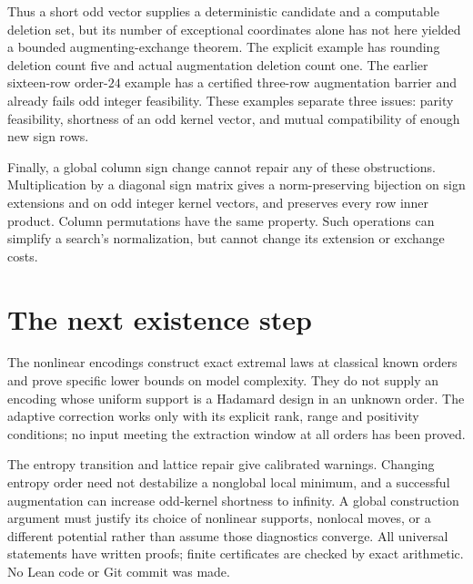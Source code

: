 \documentclass[11pt]{article}
\begin{document}
Thus a short odd vector supplies a deterministic candidate and a
computable deletion set, but its number of exceptional coordinates
alone has not here yielded a bounded augmenting-exchange theorem.
The explicit example has rounding deletion count five and actual
augmentation deletion count one. The earlier sixteen-row order-$24$
example has a certified three-row augmentation barrier and already
fails odd integer feasibility. These examples separate three issues:
parity feasibility, shortness of an odd kernel vector, and mutual
compatibility of enough new sign rows.

Finally, a global column sign change cannot repair any of these
obstructions. Multiplication by a diagonal sign matrix gives a
norm-preserving bijection on sign extensions and on odd integer kernel
vectors, and preserves every row inner product. Column permutations
have the same property. Such operations can simplify a search's
normalization, but cannot change its extension or exchange costs.

\section{The next existence step}
The nonlinear encodings construct exact extremal laws at classical
known orders and prove specific lower bounds on model complexity.
They do not supply an encoding whose uniform support is a Hadamard
design in an unknown order. The adaptive correction works only with
its explicit rank, range and positivity conditions; no input meeting
the extraction window at all orders has been proved.

The entropy transition and lattice repair give calibrated warnings.
Changing entropy order need not destabilize a nonglobal local
minimum, and a successful augmentation can increase odd-kernel
shortness to infinity. A global construction argument must justify
its choice of nonlinear supports, nonlocal moves, or a different
potential rather than assume those diagnostics converge.
All universal statements have written proofs; finite certificates are
checked by exact arithmetic. No Lean code or Git commit was made.
\end{document}
